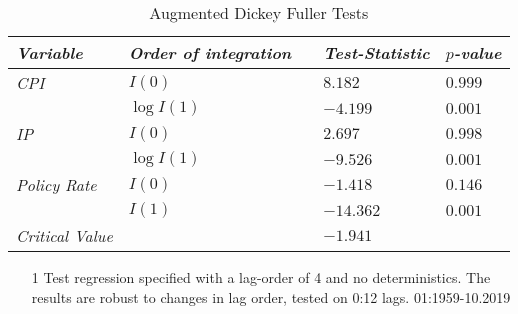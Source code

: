 \begin{table}[]
\centering
\caption{Augmented Dickey Fuller Tests}
\label{tab:ADFtests}
\begin{tabular}{@{}lllll@{}}
\toprule
\textit{Variable}       & \textit{Order of integration} & \textit{} & \textit{Test-Statistic} & \textit{$p$-value} \\ \midrule
\textit{CPI}            & $I(0)$                        &           & $8.182$                 & $0.999$            \\
\textit{}               & $\log I(1)$                &           & $-4.199$                & $0.001$            \\
\addlinespace 
\textit{IP}             & $I(0)$                       &           & $2.697$                 & $0.998$            \\
\textit{}               & $\log I(1)$                &           & $-9.526$                & $0.001$            \\
\addlinespace 
\textit{Policy Rate}    & $I(0)$                      &           & $-1.418$                & $0.146$            \\
\textit{}               & $I(1)$                        &           & $-14.362$               & $0.001$            \\ \midrule
\textit{Critical Value} &                               &           & $-1.941$                &                    \\ \bottomrule
\end{tabular}
\begin{minipage}{0.85\textwidth}
    {\footnotesize
    \begin{enumerate}
        \item[] 
        \item[1] Test regression specified with a lag-order of 4 and no deterministics. The results are robust to changes in lag order, tested on 0:12 lags. 01:1959-10.2019
    \end{enumerate}
    }\end{minipage}
\end{table}